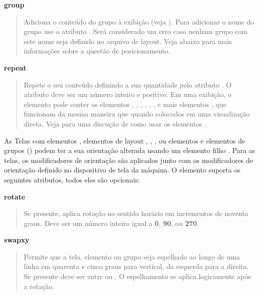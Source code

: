 \documentclass[letterpaper,10pt,brazil]{sphinxmanual}
\begin{document}
\textbf{group}
\begin{quote}

Adiciona o conteúdo do grupo à exibição
(veja {\hyperref[techspecs/layout_files:layout\string-parts\string-groups]{}}).
Para adicionar o nome do grupo use o atributo . Será
considerado um erro caso nenhum grupo com este nome seja definido
no arquivo de layout. Veja abaixo para mais informações sobre a
questão de posicionamento.
\end{quote}

\textbf{repeat}
\begin{quote}

Repete o seu conteúdo definindo a sua quantidade pelo atributo
. O atributo  deve ser um número inteiro e
positivo. Em uma exibição, o elemento  pode conter os
elementos , , , ,
, ,  e mais elementos , que
funcionam da mesma maneira que quando colocados em uma visualização
direta.
Veja {\hyperref[techspecs/layout_files:layout\string-parts\string-repeats]{}} para uma discução de como usar os
elementos .
\end{quote}

As Telas com elementos ,  elementos de layout ,
, ,  ou elementos  e elementos
de grupos () podem ter a sua orientação alterada usando um
elemento filho .
Para as telas, os modificadores de orientação são aplicados junto com os
modificadores de orientação definido no dispositivo de tela da máquina.
O elemento  suporta os seguintes atributos, todos
eles são opcionais:

\textbf{rotate}
\begin{quote}

Se presente, aplica rotação no sentido horário em incrementos de
noventa graus. Deve ser um número inteiro igual a \textbf{0}, \textbf{90}, ou
\textbf{270}.
\end{quote}

\textbf{swapxy}
\begin{quote}

Permite que a tela, elemento ou grupo seja espelhado ao longo de uma
linha em quarenta e cinco graus para vertical, da esquerda para a
direita. Se presente deve ser entre  ou .
O espelhamento se aplica logicamente após a rotação.
\end{quote}
\end{document}
